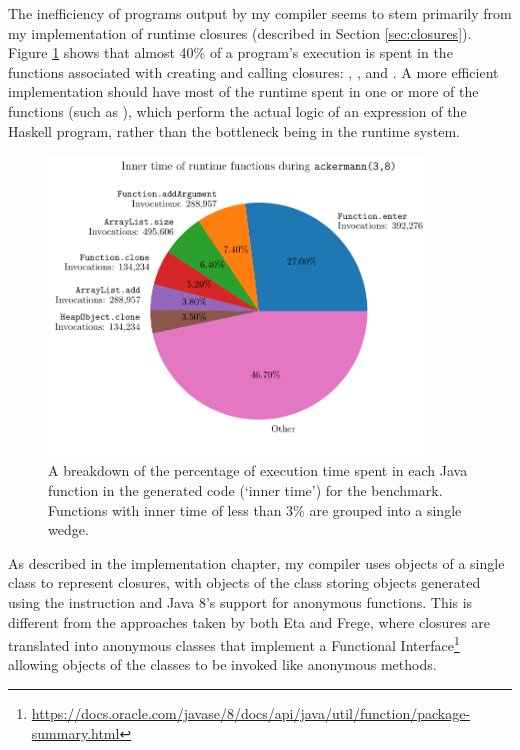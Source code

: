 \documentclass[dissertation.tex]{subfiles}
\begin{document}
{{        The inefficiency of programs output by my compiler seems to stem primarily from my implementation of runtime
        closures (described in Section \ref{sec:closures}). Figure \ref{fig:inner-time} shows that almost 40\% of a
        program's execution is spent in the functions associated with creating and calling closures: ,
        , and . A more efficient implementation should have most of the runtime
        spent in one or more of the  functions (such as ), which perform the actual
        logic of an expression of the Haskell program, rather than the bottleneck being in the runtime system.

        \begin{figure}[h]
            \centering
            \captionsetup{width=0.8\textwidth}
            \includegraphics[width=0.9\textwidth]{graphs/perf_profile_ackermann.pdf}
            \caption{A breakdown of the percentage of execution time spent in each Java function in the generated code (`inner time') for the  benchmark. Functions with inner time of less than 3\% are grouped into a single wedge.}
            \label{fig:inner-time}
        \end{figure}

        As described in the implementation chapter, my compiler uses objects of a single class to represent closures,
        with objects of the class storing  objects generated using the 
        instruction and Java 8's support for anonymous functions. This is different from the approaches taken by both
        Eta and Frege, where closures are translated into anonymous classes that implement a Functional
        Interface\footnote{\url{https://docs.oracle.com/javase/8/docs/api/java/util/function/package-summary.html}}
        allowing objects of the classes to be invoked like anonymous methods.

}}
\end{document}
